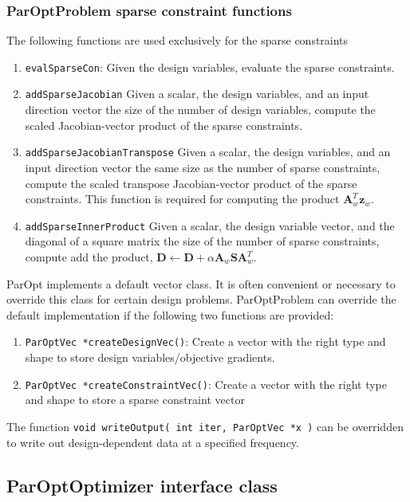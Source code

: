 \documentclass[12pt]{article}
\newcommand{\mb}{\mathbf}
\begin{document}
\subsubsection{ParOptProblem sparse constraint functions}

The following functions are used exclusively for the sparse constraints
%
\begin{enumerate}
\item \texttt{evalSparseCon}: Given the design variables, evaluate the sparse constraints.

\item \texttt{addSparseJacobian} Given a scalar, the design variables, and an input direction vector the size of the number of design variables, compute the scaled Jacobian-vector product of the sparse constraints.

\item \texttt{addSparseJacobianTranspose} Given a scalar, the design variables, and an input direction vector the same size as the number of sparse constraints, compute the scaled transpose Jacobian-vector product of the sparse constraints. This function is required for computing the product $\mb{A}_{w}^{T}\mb{z}_{w}$.

\item \texttt{addSparseInnerProduct} Given a scalar, the design variable vector, and the diagonal of a square matrix the size of the number of sparse constraints, compute add the product, $\mb{D} \leftarrow \mb{D} + \alpha \mb{A}_{w} \mb{S}\mb{A}_{w}^{T}$.
\end{enumerate}


ParOpt implements a default vector class.
It is often convenient or necessary to override this class for certain design problems.
ParOptProblem can override the default implementation if the following two functions are provided:
\begin{enumerate}
\item \texttt{ParOptVec *createDesignVec()}: Create a vector with the right type and shape to store design variables/objective gradients.
\item \texttt{ParOptVec *createConstraintVec()}: Create a vector with the right type and shape to store a sparse constraint vector
\end{enumerate}

The function \texttt{void writeOutput( int iter, ParOptVec *x )} can be overridden to write out design-dependent data at a specified frequency.

\subsection{ParOptOptimizer interface class}
\end{document}
